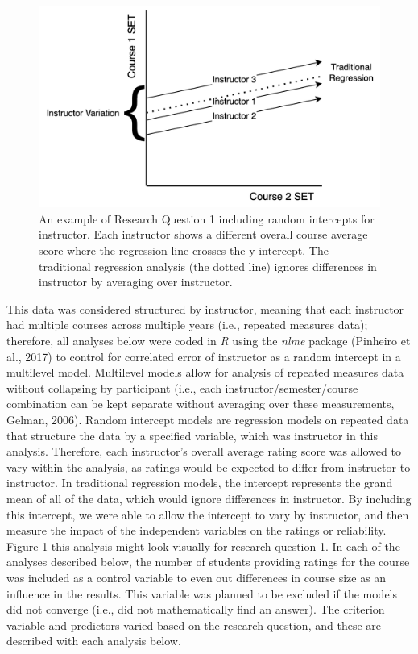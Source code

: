 \documentclass[
  man,mask]{apa7}
\begin{document}
\begin{figure}
\includegraphics[width=4.67in]{includes/random_intercept} \caption{An example of Research Question 1 including random intercepts for instructor. Each instructor shows a different overall course average score where the regression line crosses the y-intercept. The traditional regression analysis (the dotted line) ignores differences in instructor by averaging over instructor.}\label{fig:figure-random-explain}
\end{figure}

This data was considered structured by instructor, meaning that each
instructor had multiple courses across multiple years (i.e., repeated
measures data); therefore, all analyses below were coded in \emph{R} using
the \emph{nlme} package (Pinheiro et al., 2017) to control for correlated error of
instructor as a random intercept in a multilevel model. Multilevel
models allow for analysis of repeated measures data without collapsing
by participant (i.e., each instructor/semester/course combination can be
kept separate without averaging over these measurements, Gelman, 2006).
Random intercept models are regression models on repeated data that
structure the data by a specified variable, which was instructor in this
analysis. Therefore, each instructor's overall average rating score was
allowed to vary within the analysis, as ratings would be expected to differ from instructor to instructor. In traditional regression
models, the intercept represents the grand mean of all of the data,
which would ignore differences in instructor. By including this
intercept, we were able to allow the intercept to vary by instructor,
and then measure the impact of the independent variables on the ratings
or reliability. Figure \ref{fig:figure-random-explain} this analysis might look visually for research question 1. In each of
the analyses described below, the number of students providing ratings
for the course was included as a control variable to even out
differences in course size as an influence in the results. This variable
was planned to be excluded if the models did not converge (i.e., did not
mathematically find an answer). The criterion variable and predictors
varied based on the research question, and these are described with each
analysis below.
\end{document}
